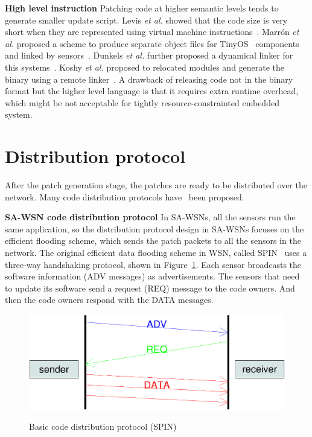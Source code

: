 \textbf{High level instruction}
Patching code at higher semantic levels tends to generate smaller update script. Levis \textit{et al.} showed that the code size is very short when they are represented using virtual machine instructions~\cite{mate}. Marr\'on \textit{et al.} proposed a scheme to produce separate object files for TinyOS~\cite{tinyos} components and linked by sensors~\cite{related:flexcup}. Dunkels \textit{et al.} further proposed a dynamical linker for this systems~\cite{related:dynamic1}. Koshy \textit{et al.} proposed to relocated modules and generate the binary using a remote linker~\cite{related:dynamic2}.
A drawback of releasing code not in the binary format but the higher level language is that it requires extra runtime overhead, which might be not acceptable for tightly resource-constrainted embedded system.

\section{Distribution protocol}

After the patch generation stage, the patches are ready to be distributed over the network. Many code distribution protocols have~\cite{spin,trickle,melete,deluge,mnp} been proposed.

\textbf{SA-WSN code distribution protocol}
In SA-WSNs, all the sensors run the same application, so the distribution protocol design in SA-WSNs focuses on the efficient flooding scheme, which sends the patch packets to all the sensors in the network. The original efficient data flooding scheme in WSN, called SPIN~\cite{spin} uses a three-way handshaking protocol, shown in Figure~\ref{fig:spin}. Each sensor broadcasts the software information (ADV messages) as advertisements. The sensors that need to update its software send a request (REQ) message to the code owners. And then the code owners respond with the DATA messages.

\begin{figure}[htbp]
	\centering
		\includegraphics[scale=0.4]{figures/basic-protocol.eps}
	\label{fig:spin}
	\caption{Basic code distribution protocol (SPIN)}
\end{figure}

